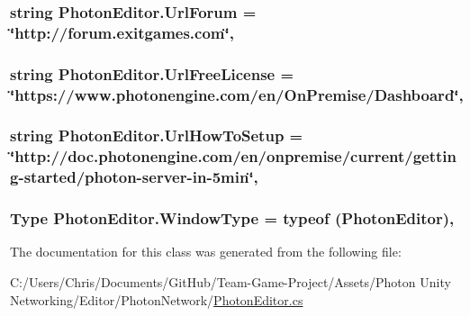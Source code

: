 \subsubsection[{\texorpdfstring{Url\+Forum}{UrlForum}}]{\setlength{\rightskip}{0pt plus 5cm}string Photon\+Editor.\+Url\+Forum = \char`\"{}http\+://forum.\+exitgames.\+com\char`\"{}\hspace{0.3cm}{\ttfamily [static]}, {\ttfamily [protected]}}\hypertarget{class_photon_editor_afcb7450394c6278d2599f1b9115cc902}{}\label{class_photon_editor_afcb7450394c6278d2599f1b9115cc902}
\subsubsection[{\texorpdfstring{Url\+Free\+License}{UrlFreeLicense}}]{\setlength{\rightskip}{0pt plus 5cm}string Photon\+Editor.\+Url\+Free\+License = \char`\"{}https\+://www.\+photonengine.\+com/en/On\+Premise/Dashboard\char`\"{}\hspace{0.3cm}{\ttfamily [static]}, {\ttfamily [protected]}}\hypertarget{class_photon_editor_a93dc60253b81669da6cb308d2231d051}{}\label{class_photon_editor_a93dc60253b81669da6cb308d2231d051}
\subsubsection[{\texorpdfstring{Url\+How\+To\+Setup}{UrlHowToSetup}}]{\setlength{\rightskip}{0pt plus 5cm}string Photon\+Editor.\+Url\+How\+To\+Setup = \char`\"{}http\+://doc.\+photonengine.\+com/en/onpremise/current/getting-\/started/photon-\/server-\/in-\/5min\char`\"{}\hspace{0.3cm}{\ttfamily [static]}, {\ttfamily [protected]}}\hypertarget{class_photon_editor_aa0d6b2dd69b2acbb818483ef4c07d1b5}{}\label{class_photon_editor_aa0d6b2dd69b2acbb818483ef4c07d1b5}
\subsubsection[{\texorpdfstring{Window\+Type}{WindowType}}]{\setlength{\rightskip}{0pt plus 5cm}Type Photon\+Editor.\+Window\+Type = typeof ({\bf Photon\+Editor})\hspace{0.3cm}{\ttfamily [static]}, {\ttfamily [protected]}}\hypertarget{class_photon_editor_a4d9c4354d88e679b621ff016702c44c7}{}\label{class_photon_editor_a4d9c4354d88e679b621ff016702c44c7}


The documentation for this class was generated from the following file\+:\begin{DoxyCompactItemize}
\item 
C\+:/\+Users/\+Chris/\+Documents/\+Git\+Hub/\+Team-\/\+Game-\/\+Project/\+Assets/\+Photon Unity Networking/\+Editor/\+Photon\+Network/\hyperlink{_photon_editor_8cs}{Photon\+Editor.\+cs}\end{DoxyCompactItemize}
